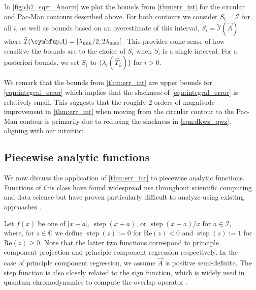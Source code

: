 In \cref{fig:ch7_sqrt_Anorm} we plot the bounds from \cref{thm:err_int} for the circular and Pac-Man contours described above.
For both contours we consider \( S_i = \mathcal{I} \) for all \( i \), as well as bounds based on an overestimate of this interval,  \( S_i = \tilde{\mathcal{I}}(\vec{A}) \) where 
\(
    \tilde{\mathcal{I}}(\vec{A}) = [ \lmin/2, 2 \lmax].
\)
This provides some sense of how sensitive the bounds are to the choice of \( S_i \) when $S_i$ is a single interval. 
For a posteriori bounds, we set \( S_i \) to $\{\lambda_i(\vec T_k)\}$ for \( i > 0 \).

We remark that the bounds from \cref{thm:err_int} are upper bounds for \cref{eqn:integral_error} which implies that the slackness of \cref{eqn:integral_error} is relatively small.
This suggests that the roughly 2 orders of magnitude improvement in \cref{thm:err_int} when moving from the circular contour to the Pac-Man contour is primarily due to reducing the slackness in \cref{eqn:dkwz_qwz}, aligning with our intuition.

\subsection{Piecewise analytic functions}
\label{ex:cif_pw}

We now discuss the application of \cref{thm:err_int} to piecewise analytic functions.
Functions of this class have found widespread use throughout scientific computing and data science but have proven particularly difficult to analyze using existing approaches \cite{dinapoli_polizzi_saad_16,frostig_musco_musco_sidford_16,jin_sidford_19,eshof_frommer_lippert_schilling_van_der_vorst_02}.

Let \( f(x) \) be one of \( |x-a| \), \( \operatorname{step}(x-a) \), or \( \operatorname{step}(x-a)/x \) for \( a \in \mathcal{I} \), where, for \( z \in \mathbb{C} \) we define $\operatorname{step}(z) := 0$ for $\text{Re}(z) < 0$ and $\operatorname{step}(z) := 1$ for $\text{Re}(z) \ge 0$.
Note that the latter two functions correspond to principle component projection and principle component regression respectively.
In the case of principle component regression, we assume $\vec{A}$ is positive semi-definite.
The step function is also closely related to the sign function, which is widely used in quantum chromodynamics to compute the overlap operator \cite{eshof_frommer_lippert_schilling_van_der_vorst_02}.

